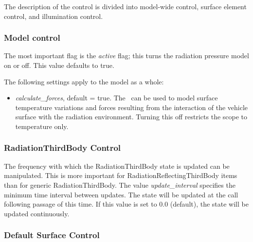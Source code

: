 The description of the control is divided into model-wide control, surface element control, and illumination control.

\subsubsection{Model control}

The most important flag is the \textit{active} flag; this turns the radiation pressure model on or off.  This value defaults to true.

The following settings apply to the model as a whole:
\begin{itemize}
\item{\textit{calculate\_forces}, default = true}.  \newline
The \RadiationPressureDesc\ can be used to model surface temperature variations and forces resulting from the interaction of the vehicle surface with the radiation environment.  Turning this off restricts the scope to temperature only.
\end{itemize}

\subsubsection{RadiationThirdBody Control}
The frequency with which the RadiationThirdBody state is updated can be
manipulated.  This is more important for RadiationReflectingThirdBody items
than for generic RadiationThirdBody.  The value \textit{update\_interval}
specifies the minimum time interval between updates.  The state will be updated
at the call following passage of this time.  If this value is set to 0.0
(default), the state will be updated continuously.


\subsubsection{Default Surface Control}

